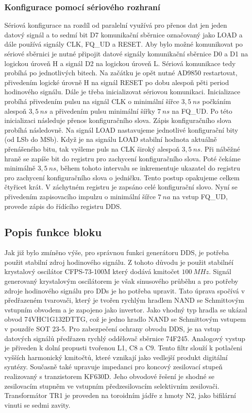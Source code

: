 \subsubsection{Konfigurace pomocí sériového rozhraní}
\indent\indent Sériová konfigurace na rozdíl od paralelní využívá pro přenos dat jen jeden datový signál a to sedmí bit D7 komunikační sběrnice označovaný jako LOAD a dále používá signály CLK, FQ\_UD a RESET. Aby bylo možné komunikovat po sériové sběrnici je nutné připojit datové signály komunikační sběrnice D0 a D1 na logickou úroveň H a signál D2 na logickou úroveň L. Sériová komunikace tedy probíhá po jednotlivých bitech. Na začátku je opět nutné AD9850 restartovat, přivedením logické úrovně H na signál RESET po dobu alespoň pěti period hodinového signálu. Dále je třeba inicializovat sériovou komunikaci. Inicializace probíhá přivedením pulsu na signál CLK o minimální šířce $3,5~ns$ počkáním alespoň $3,5~ns$ a přivedením pulsu minimální šířky $7~ns$ na FQ\_UD. Po této inicializaci následuje přenos konfiguračního slova. Zápis konfiguračního slova probíhá následovně. Na signál LOAD nastavujeme jednotlivé konfigurační bity (od LSb do MSb). Když je na signálu LOAD stabilní hodnota aktuálně přenášeného bitu, tak vyšleme puls na CLK široký alespoň $3,5~ns$. Při náběžné hraně se zapíše bit do registru pro zachycení konfiguračního slova. Poté čekáme minimálně $3,5~ns$, během tohoto intervalu se inkrementuje ukazatel do registru pro zachycení konfiguračního slova o jedničku. Tento postup opakujeme celkem čtyřicet krát. V záchytném registru je zapsáno celé konfigurační slovo. Nyní se přivedením zapisovacího impulzu o minimální šířce $7~na$ na vstup FQ\_UD, provede zápis do řídícího registru DDS.
  			
\subsection{Popis funkce bloku}
\indent\indent Jak již bylo zmíněno výše, pro správnou funkci generátoru DDS, je potřeba použit stabilní zdroj hodinového signálu. Z tohoto důvodu je použit stabilnéí krystalový oscilátor CFPS-73-100M který dodává kmitočet $100~MHz$. Signál generovaný krystalovým oscilátorem je však sinusového průběhu a pro potřeby zdroje hodinového signálu pro DDs je ho potřeba upravit. Tato úprava spočívá v předřazeném tvarovači, který je tvořen rychlým hradlem NAND se Schmittovým vstupním obvodem a je zapojeno jako invertor. Jako vhodný typ hradla se ukázal obvod 74VHC1G132DTTG, což je jedno hradlo NAND se Schmittovým vstupem v pouzdře SOT 23-5. 
Pro zabezpečení ochrany obvodu DDS, je na vstup datových signálů předřazen rychlý oddělovač sběrnice 74F245. Analogový vystup je přiveden k dolní propusti tvořenou L1, C8 a C9. Tento filtr slouží k potlačeni vyšších harmonický kmitočtů, které vznikají jako vedlejší produkt digitální syntézy. Současně také upravuje impedanci pro koncový zesilovací stupeň realizovaný s tranzistorem KF630D. Jeho obvodové řešení je shodné se zesilovacím stupněm ve vstupním předzesilovacím selektivním zesilovači. Transformátor TR1 je proveden na toroidním jádře z hmoty N2, jako bifilární vinuti se sedmi zavity.

